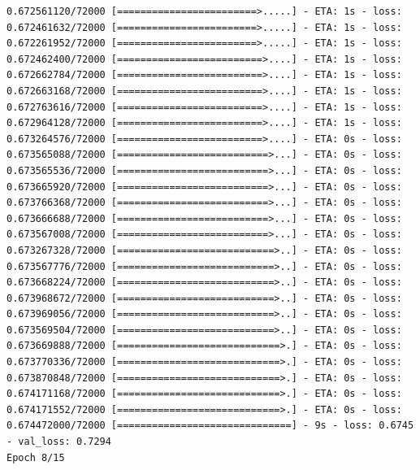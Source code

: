 \documentclass[12pt,fleqn]{article}\usepackage{../../common}
\begin{document}
\begin{verbatim}
0.672561120/72000 [========================>.....] - ETA: 1s - loss: 0.672461632/72000 [========================>.....] - ETA: 1s - loss: 0.672261952/72000 [========================>.....] - ETA: 1s - loss: 0.672462400/72000 [=========================>....] - ETA: 1s - loss: 0.672662784/72000 [=========================>....] - ETA: 1s - loss: 0.672663168/72000 [=========================>....] - ETA: 1s - loss: 0.672763616/72000 [=========================>....] - ETA: 1s - loss: 0.672964128/72000 [=========================>....] - ETA: 1s - loss: 0.673264576/72000 [=========================>....] - ETA: 0s - loss: 0.673565088/72000 [==========================>...] - ETA: 0s - loss: 0.673565536/72000 [==========================>...] - ETA: 0s - loss: 0.673665920/72000 [==========================>...] - ETA: 0s - loss: 0.673766368/72000 [==========================>...] - ETA: 0s - loss: 0.673666688/72000 [==========================>...] - ETA: 0s - loss: 0.673567008/72000 [==========================>...] - ETA: 0s - loss: 0.673267328/72000 [===========================>..] - ETA: 0s - loss: 0.673567776/72000 [===========================>..] - ETA: 0s - loss: 0.673668224/72000 [===========================>..] - ETA: 0s - loss: 0.673968672/72000 [===========================>..] - ETA: 0s - loss: 0.673969056/72000 [===========================>..] - ETA: 0s - loss: 0.673569504/72000 [===========================>..] - ETA: 0s - loss: 0.673669888/72000 [============================>.] - ETA: 0s - loss: 0.673770336/72000 [============================>.] - ETA: 0s - loss: 0.673870848/72000 [============================>.] - ETA: 0s - loss: 0.674171168/72000 [============================>.] - ETA: 0s - loss: 0.674171552/72000 [============================>.] - ETA: 0s - loss: 0.674472000/72000 [==============================] - 9s - loss: 0.6745 - val_loss: 0.7294
Epoch 8/15

\end{verbatim}
\end{document}
